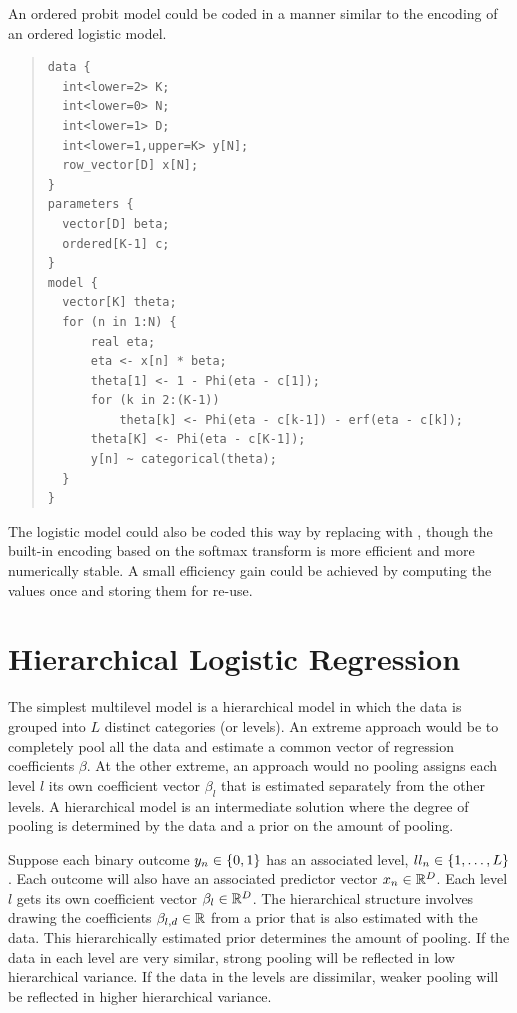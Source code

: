 An ordered probit model could be coded in a manner similar to the
\BUGS encoding of an ordered logistic model.
%
\begin{quote}
\begin{Verbatim}
data {
  int<lower=2> K;
  int<lower=0> N;
  int<lower=1> D;
  int<lower=1,upper=K> y[N];
  row_vector[D] x[N];
}
parameters {
  vector[D] beta;
  ordered[K-1] c;
}
model {
  vector[K] theta;
  for (n in 1:N) {
      real eta;
      eta <- x[n] * beta;
      theta[1] <- 1 - Phi(eta - c[1]);
      for (k in 2:(K-1))
          theta[k] <- Phi(eta - c[k-1]) - erf(eta - c[k]);
      theta[K] <- Phi(eta - c[K-1]);
      y[n] ~ categorical(theta);
  }
}
\end{Verbatim}
\end{quote}
%
The logistic model could also be coded this way by replacing
 with , though the built-in encoding based
on the softmax transform is more efficient and more numerically
stable.  A small efficiency gain could be achieved by computing the
values  once and storing them for re-use.

\section{Hierarchical Logistic Regression}

The simplest multilevel model is a hierarchical model in which the
data is grouped into $L$ distinct categories (or levels).  An extreme approach would be to
completely pool all the data and estimate a common vector of
regression coefficients $\beta$.  At the other extreme, an approach
would no pooling assigns each level $l$ its own coefficient vector
$\beta_l$ that is estimated separately from the other levels.  A
hierarchical model is an intermediate solution where the degree of
pooling is determined by the data and a prior on the amount of
pooling.

Suppose each binary outcome $y_n \in \{ 0,1 \}$ has an associated
level, $ll_n \in \{ 1,\ldots,L \}$.  Each outcome will also have
an associated predictor vector $x_n \in \mathbb{R}^D$.  Each level $l$
gets its own coefficient vector $\beta_l \in \mathbb{R}^D$.  The
hierarchical structure involves drawing the coefficients $\beta_{l,d}
\in \mathbb{R}$ from a prior that is also estimated with the data.  This
hierarchically estimated prior determines the amount of pooling.  If
the data in each level are very similar, strong pooling will be
reflected in low hierarchical variance.  If the data in the levels are
dissimilar, weaker pooling will be reflected in higher hierarchical variance.

